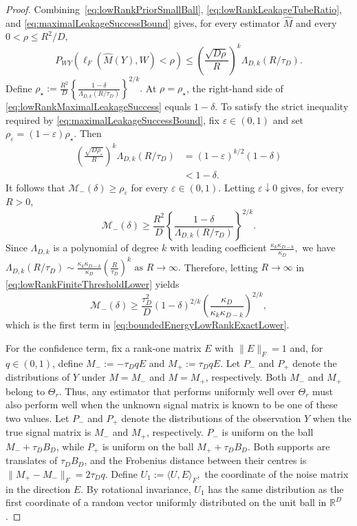 \documentclass[11pt]{article}
\theoremstyle{definition}
\theoremstyle{remark}
\newcommand{\1}{\boldsymbol{1}}
\begin{document}
\begin{proof}
Combining~\eqref{eq:lowRankPriorSmallBall},
\eqref{eq:lowRankLeakageTubeRatio}, and
\eqref{eq:maximalLeakageSuccessBound} gives, for every estimator
$\widehat M$ and every $0<\rho\leq R^2/D$,
\begin{equation}
P_{WY}\!\left(
    \ell_F(\widehat M(Y),W)<\rho
\right)
\leq
\left(
    \frac{\sqrt{D\rho}}{R}
\right)^k
\Lambda_{D,k}(R/\tau_D).
\label{eq:lowRankMaximalLeakageSuccess}
\end{equation}
Define
\(
\rho_\star
:=
\frac{R^2}{D}
\left\{
    \frac{1-\delta}
         {\Lambda_{D,k}(R/\tau_D)}
\right\}^{2/k}.
\)
At $\rho=\rho_\star$, the right-hand side of
\eqref{eq:lowRankMaximalLeakageSuccess} equals $1-\delta$.  To satisfy
the strict inequality required by
\eqref{eq:maximalLeakageSuccessBound}, fix $\varepsilon\in(0,1)$ and set
$\rho_\varepsilon=(1-\varepsilon)\rho_\star$.  Then
\begin{align}
\left(
    \frac{\sqrt{D\rho_\varepsilon}}{R}
\right)^k
\Lambda_{D,k}(R/\tau_D)
&=
(1-\varepsilon)^{k/2}(1-\delta)
\\
&<
1-\delta.
\end{align}
It follows that \(\mathcal M_-(\delta)\geq\rho_\varepsilon\) for every
\(\varepsilon\in(0,1)\).
Letting \(\varepsilon\downarrow0\) gives, for every \(R>0\),
\begin{equation}
\mathcal M_-(\delta)
\ge
\frac{R^2}{D}
\left\{
    \frac{1-\delta}
         {\Lambda_{D,k}(R/\tau_D)}
\right\}^{2/k}.
\label{eq:lowRankFiniteThresholdLower}
\end{equation}
Since \(\Lambda_{D,k}\) is a polynomial of degree \(k\) with leading
coefficient
\(
\frac{\kappa_k\kappa_{D-k}}{\kappa_D},
\)
we have
\(
\Lambda_{D,k}(R/\tau_D)
\sim
\frac{\kappa_k\kappa_{D-k}}{\kappa_D}
\left(\frac{R}{\tau_D}\right)^k\text{ as }R\to\infty.
\)
Therefore, letting \(R\to\infty\) in
\eqref{eq:lowRankFiniteThresholdLower} yields
\[
\mathcal M_-(\delta)\ge
\frac{\tau_D^2}{D}(1-\delta)^{2/k}
\left(\frac{\kappa_D}{\kappa_k\kappa_{D-k}}\right)^{2/k},
\]
which is the first term in
\eqref{eq:boundedEnergyLowRankExactLower}.

For the confidence term, fix a rank-one matrix $E$ with $\|E\|_F=1$ and,
for $q\in(0,1)$, define \(M_-:=-\tau_DqE\) and
\(M_+:=\tau_DqE\).
Let $P_-$ and $P_+$ denote the distributions of $Y$ under
$M=M_-$ and $M=M_+$, respectively.
Both $M_-$ and $M_+$ belong to $\Theta_r$.  Thus, any estimator that
performs uniformly well over $\Theta_r$ must also perform well when the
unknown signal matrix is known to be one of these two values.
Let $P_-$ and $P_+$ denote the distributions of the observation $Y$
when the true signal matrix is $M_-$ and $M_+$, respectively.
$P_-$ is uniform on the ball $M_-+\tau_DB_D$, while $P_+$ is
uniform on the ball $M_++\tau_DB_D$. Both supports are translates of $\tau_DB_D$,
and the Frobenius distance between their centres is
\(\|M_+-M_-\|_F=2\tau_Dq\).
Define
\(
U_1:=\langle U,E\rangle_F,
\)
the coordinate of the noise matrix in the direction $E$.  By rotational
invariance, $U_1$ has the same distribution as the first coordinate of a
random vector uniformly distributed on the unit ball in $\mathbb R^D$.


\end{proof}
\end{document}
